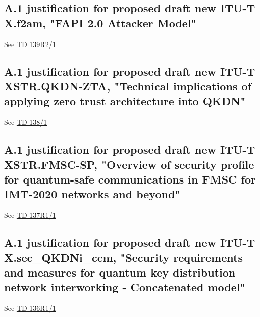 \newpage

\subsection*{A.1 justification for proposed draft new ITU-T X.f2am, "FAPI 2.0 Attacker Model"}
See \href{https://www.itu.int/md/meetingdoc.asp?lang=en\&parent=T25-SG17-251203-TD-WP1-0139}{TD 139R2/1}

\newpage

\subsection*{A.1 justification for proposed draft new ITU-T XSTR.QKDN-ZTA, "Technical implications of applying zero trust architecture  into QKDN"}
See \href{https://www.itu.int/md/meetingdoc.asp?lang=en\&parent=T25-SG17-251203-TD-WP1-0138}{TD 138/1}

\newpage

\subsection*{A.1 justification for proposed draft new ITU-T XSTR.FMSC-SP, "Overview of security profile for quantum-safe communications in FMSC for IMT-2020 networks and beyond"}
See \href{https://www.itu.int/md/meetingdoc.asp?lang=en\&parent=T25-SG17-251203-TD-WP1-0137}{TD 137R1/1}

\newpage

\subsection*{A.1 justification for proposed draft new ITU-T X.sec\_QKDNi\_ccm, "Security requirements and measures for quantum key distribution network interworking - Concatenated model"}
See \href{https://www.itu.int/md/meetingdoc.asp?lang=en\&parent=T25-SG17-251203-TD-WP1-0136}{TD 136R1/1}

